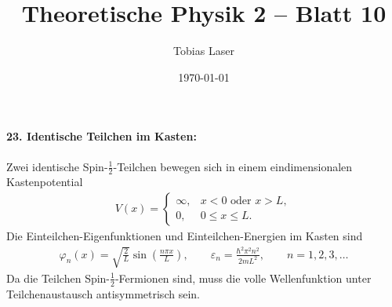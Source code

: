 \documentclass[11pt,a4paper]{scrartcl}
\newcommand{\eps}{\varepsilon}
\begin{document}
    \title{Theoretische Physik 2 -- Blatt 10}
    \author{Tobias Laser}
    \date{\today}
    \maketitle
    \vfill
    \thispagestyle{empty}
    \newpage


    \paragraph{23. Identische Teilchen im Kasten:}

    Zwei identische Spin-$\frac12$-Teilchen bewegen sich in einem eindimensionalen Kastenpotential
    \begin{align*}
        V(x)=
        \begin{cases}
            \infty, & x<0 \text{ oder } x>L,\\
            0, & 0\le x\le L.
        \end{cases}
    \end{align*}
    Die Einteilchen-Eigenfunktionen und Einteilchen-Energien im Kasten sind
    \begin{align*}
        \varphi_n(x)=\sqrt{\frac{2}{L}}\sin\left(\frac{n\pi x}{L}\right),
        \qquad
        \eps_n=\frac{\hbar^2\pi^2 n^2}{2mL^2},
        \qquad n=1,2,3,\dots
    \end{align*}
    Da die Teilchen Spin-$\frac12$-Fermionen sind, muss die volle Wellenfunktion unter Teilchenaustausch antisymmetrisch sein.
\end{document}

